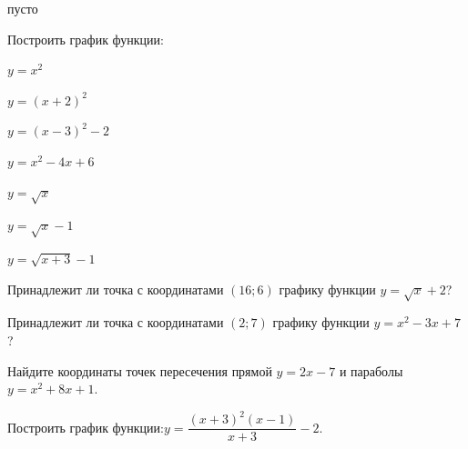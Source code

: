 \begin{class}[number=7]
	\begin{listofex}
	 \item пусто
	\end{listofex}
\end{class}
%
%
%	
%
%
\begin{consultation}
	\begin{listofex}
		\item Построить график функции:
		\begin{enumcols}[itemcolumns=2]
			\item \( y=x^2 \)
			\item \( y=(x+2)^2 \)
			\item \( y=(x-3)^2-2 \)
			\item \( y=x^2-4x+6 \)
			\item \( y=\sqrt{x} \)
			\item \( y=\sqrt{x}-1 \)
			\item \( y=\sqrt{x+3}-1 \)
		\end{enumcols}
		\item Принадлежит ли точка с координатами \( (16;6) \) графику функции \( y=\sqrt{x}+2 \)?
		\item Принадлежит ли точка с координатами \( (2;7) \) графику функции \( y=x^2-3x+7 \)?
		\item Найдите координаты точек пересечения прямой \( y=2x-7 \) и параболы \( y=x^2+8x+1 \).
		\item Построить график функции:\quad\( y=\dfrac{(x+3)^2(x-1)}{x+3}-2 \).
	\end{listofex}
\end{consultation}
%
%
